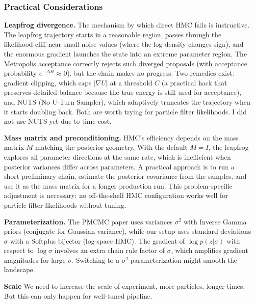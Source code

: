 \documentclass{article}
\begin{document}
\subsubsection{Practical Considerations}

\textbf{Leapfrog divergence.} The mechanism by which direct HMC fails is instructive. The leapfrog trajectory starts in a reasonable region, passes through the likelihood cliff near small noise values (where the log-density changes sign), and the enormous gradient launches the state into an extreme parameter region. The Metropolis acceptance correctly rejects such diverged proposals (with acceptance probability $e^{-\Delta H} \approx 0$), but the chain makes no progress. Two remedies exist: gradient clipping, which caps $|\nabla U|$ at a threshold $C$ (a practical hack that preserves detailed balance because the true energy is still used for acceptance), and NUTS (No U-Turn Sampler), which adaptively truncates the trajectory when it starts doubling back\cite{Neal-2012-MCMC-Hamiltonian-Dynamics-ARXIV-1206-1901v1}. Both are worth trying for particle filter likelihoods. I did not use NUTS yet due to time cost.

\textbf{Mass matrix and preconditioning.} HMC's efficiency depends on the mass matrix $M$ matching the posterior geometry. With the default $M = I$, the leapfrog explores all parameter directions at the same rate, which is inefficient when posterior variances differ across parameters. A practical approach is to run a short preliminary chain, estimate the posterior covariance from the samples, and use it as the mass matrix for a longer production run. This problem-specific adjustment is necessary: no off-the-shelf HMC configuration works well for particle filter likelihoods without tuning.

\textbf{Parameterization.} The PMCMC paper uses variances $\sigma^2$ with Inverse Gamma priors (conjugate for Gaussian variance), while our setup uses standard deviations $\sigma$ with a Softplus bijector (log-space HMC). The gradient of $\log p(z|\sigma)$ with respect to $\log \sigma$ involves an extra chain rule factor of $\sigma$, which amplifies gradient magnitudes for large $\sigma$. Switching to a $\sigma^2$ parameterization might smooth the landscape.

\textbf{Scale} We need to increase the scale of experiment, more particles, longer times. But this can only happen for well-tuned pipeline.



\end{document}
